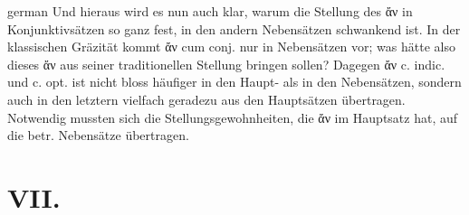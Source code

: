 \begin{otherlanguage*}{german}
Und hieraus wird es nun auch klar, warum die Stellung des ἄν in Konjunktivsätzen so ganz fest, in den andern Nebensätzen schwankend ist. In der klassischen Gräzität kommt ἄν cum conj. nur in Nebensätzen vor; was hätte also dieses ἄν aus seiner traditionellen Stellung bringen sollen? Dagegen ἄν c. indic. und c. opt. ist nicht bloss häufiger in den Haupt- als in den Nebensätzen, sondern auch in den letztern vielfach geradezu aus den Hauptsätzen übertragen. Notwendig mussten sich die Stellungsgewohnheiten, die ἄν im Hauptsatz hat, auf die betr. Nebensätze übertragen.

\section*{VII.}


\end{otherlanguage*}
